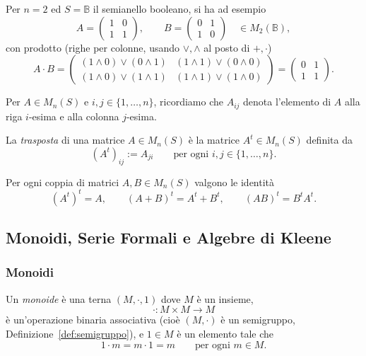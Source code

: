 \begin{rema}
Per $n=2$ ed $S=\mathbb{B}$ il semianello booleano, si ha ad esempio
\[A=\begin{pmatrix} 1 & 0 \\ 1 & 1\end{pmatrix}, \qquad B=\begin{pmatrix} 0 & 1 \\ 1 & 0\end{pmatrix} \quad \in M_2(\mathbb{B}),\]
con prodotto (righe per colonne, usando $\vee,\wedge$ al posto di $+,\cdot$)
\[A\cdot B = \begin{pmatrix} (1\wedge 0)\vee(0\wedge 1) & (1\wedge 1)\vee(0\wedge 0) \\ (1\wedge 0)\vee(1\wedge 1) & (1\wedge 1)\vee(1\wedge 0)\end{pmatrix} = \begin{pmatrix} 0 & 1 \\ 1 & 1\end{pmatrix}.\]
\end{rema}

Per $A\in M_n(S)$ e $i,j\in\{1,\dots,n\}$, ricordiamo che $A_{ij}$ denota l'elemento di $A$ alla riga $i$-esima e alla colonna $j$-esima.

\begin{defi}[Trasposta]\label{def:trasposta}
La \emph{trasposta} di una matrice $A\in M_n(S)$ è la matrice $A^t\in M_n(S)$ definita da
\[(A^t)_{ij} := A_{ji} \qquad \text{per ogni } i,j\in\{1,\dots,n\}.\]
\end{defi}

Per ogni coppia di matrici $A,B\in M_n(S)$ valgono le identità
\[(A^t)^t=A, \qquad (A+B)^t=A^t+B^t, \qquad (AB)^t=B^tA^t.\]

\subsection{Monoidi, Serie Formali e Algebre di Kleene}

\subsubsection{Monoidi}\label{subsubsection: monoidi}

\begin{defi}[Monoide]\label{def:monoide}
Un \emph{monoide} è una terna $(M,\cdot,1)$ dove $M$ è un insieme,
\[\cdot: M\times M \to M\]
è un'operazione binaria associativa (cioè $(M,\cdot)$ è un semigruppo, Definizione~\ref{def:semigruppo}), e $1\in M$ è un elemento tale che
\[1\cdot m = m\cdot 1 = m \qquad \text{per ogni } m\in M.\]
\end{defi}



